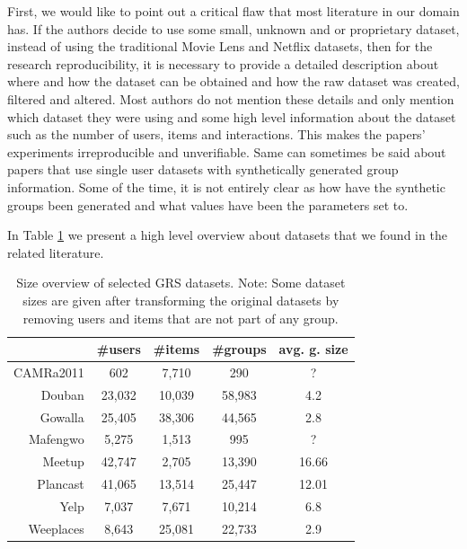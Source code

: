 First, we would like to point out a critical flaw that most literature in our domain has. If the authors decide to use some small, unknown and or proprietary dataset, instead of using the traditional Movie Lens and Netflix datasets, then for the research reproducibility, it is necessary to provide a detailed description about where and how the dataset can be obtained and how the raw dataset was created, filtered and altered. Most authors do not mention these details and only mention which dataset they were using and some high level information about the dataset such as the number of users, items and interactions. This makes the papers' experiments irreproducible and unverifiable. Same can sometimes be said about papers that use single user datasets with synthetically generated group information. Some of the time, it is not entirely clear as how have the synthetic groups been generated and what values have been the parameters set to.

In Table \ref{table:5.2_GRS_datasets_comparation} we present a high level overview about datasets that we found in the related literature.

\begin{table}[!ht]
    \centering
    \begin{tabular}{ r | c c c c }
         & \#users & \#items & \#groups & avg. g. size \\
        \hline
            CAMRa2011\cite{attentative_group_recommendation}
                & 602 & 7,710 & 290 & ? \\
            Douban\cite{gowalla_weeplaces_yelp}
                & 23,032 & 10,039 & 58,983 & 4.2 \\
            Gowalla\cite{gowalla_weeplaces_yelp}
                & 25,405 &  38,306 & 44,565 &  2.8 \\
            Mafengwo\cite{attentative_group_recommendation}
                & 5,275 & 1,513 & 995 & ? \\
            Meetup\cite{meetup_origin}
                & 42,747 & 2,705 & 13,390 & 16.66 \\
            Plancast\cite{meetup_plancast}
                & 41,065 & 13,514 & 25,447 & 12.01 \\
            Yelp\cite{gowalla_weeplaces_yelp}
                & 7,037 & 7,671 & 10,214 & 6.8 \\
            Weeplaces\cite{gowalla_weeplaces_yelp}
                &  8,643 & 25,081 & 22,733 & 2.9 \\
    \end{tabular}
    \caption[Size overview of selected GRS datasets]{Size overview of selected GRS datasets. Note: Some dataset sizes are given after transforming the original datasets by removing users and items that are not part of any group.}
    \label{table:5.2_GRS_datasets_comparation}
\end{table}



